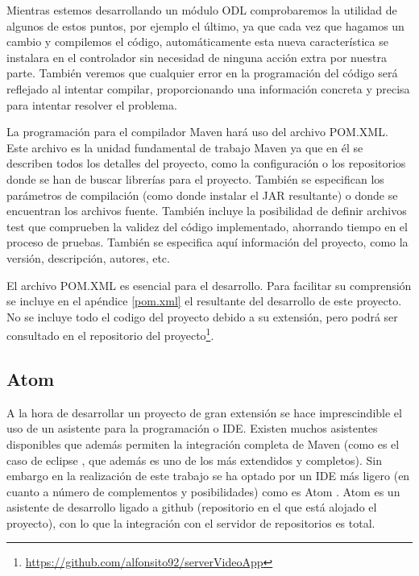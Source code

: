 \documentclass[a4paper,11pt]{book}
\begin{document}
Mientras estemos desarrollando un módulo \ac{ODL} comprobaremos la utilidad de algunos de estos puntos, por ejemplo el último, ya que cada vez que hagamos un cambio y compilemos el código, automáticamente esta nueva característica se instalara en el controlador sin necesidad de ninguna acción extra por nuestra parte. También veremos que cualquier error en la programación del código será reflejado al intentar compilar, proporcionando una información concreta y precisa para intentar resolver el problema.

La programación para el compilador Maven hará uso del archivo \ac{POM}.\ac{XML}. Este archivo es la unidad fundamental de trabajo Maven ya que en él se describen todos los detalles del proyecto, como la configuración o los repositorios donde se han de buscar librerías para el proyecto. También se especifican los parámetros de compilación (como donde instalar el \ac{JAR} resultante) o donde se encuentran los archivos fuente. También incluye la posibilidad de definir archivos test que comprueben la validez del código implementado, ahorrando tiempo en el proceso de pruebas. También se especifica aquí información del proyecto, como la versión, descripción, autores, etc.

El archivo \ac{POM}.\ac{XML} es esencial para el desarrollo. Para facilitar su comprensión se incluye en el apéndice \ref{pom.xml} el resultante del desarrollo de este proyecto. No se incluye todo el codigo del proyecto debido a su extensión, pero podrá ser consultado en el repositorio del proyecto\footnote{\url{https://github.com/alfonsito92/serverVideoApp}}.

\subsection{Atom}
A la hora de desarrollar un proyecto de gran extensión se hace imprescindible el uso de un asistente para la programación o \ac{IDE}. Existen muchos asistentes disponibles que además permiten la integración completa de Maven (como es el caso de eclipse \cite{eclipse}, que además es uno de los más extendidos y completos). Sin embargo en la realización de este trabajo se ha optado por un \ac{IDE} más ligero (en cuanto a número de complementos y posibilidades) como es Atom \cite{atom}. Atom es un asistente de desarrollo ligado a github (repositorio en el que está alojado el proyecto), con lo que la integración con el servidor de repositorios es total. 
\end{document}
